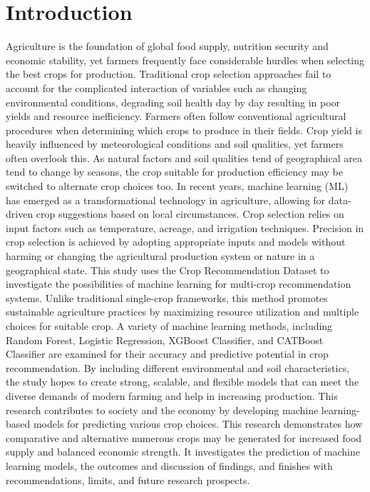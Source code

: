 \documentclass[conference]{IEEEtran}
\begin{document}
\section{Introduction}
Agriculture is the foundation of global food supply, nutrition security and economic stability, yet farmers frequently face considerable hurdles when selecting the best crops for production. Traditional crop selection approaches fail to account for the complicated interaction of variables such as changing environmental conditions, degrading soil health day by day resulting in poor yields and resource inefficiency.\cite{kumar2024enhanced} Farmers often follow conventional agricultural procedures when determining which crops to produce in their fields. Crop yield is heavily influenced by meteorological conditions and soil qualities, yet farmers often overlook this.\cite{kumar2024enhanced}  As natural factors and soil qualities tend of geographical area tend to change by seasons, the crop suitable for production efficiency may be switched to alternate crop choices too. 
In recent years, machine learning (ML) has emerged as a transformational technology in agriculture, allowing for data-driven crop suggestions based on local circumstances.\cite{9214190} Crop selection relies on input factors such as temperature, acreage, and irrigation techniques. Precision in crop selection is achieved by adopting appropriate inputs and models without harming or changing the agricultural production system or nature in a geographical state.\cite{9418375}
This study uses the Crop Recommendation Dataset to investigate the possibilities of machine learning for multi-crop recommendation systems. Unlike traditional single-crop frameworks, this method promotes sustainable agriculture practices by maximizing resource utilization and multiple choices for suitable crop. A variety of machine learning methods, including Random Forest, Logistic Regression, XGBoost Classifier, and CATBoost Classifier are examined for their accuracy and predictive potential in crop recommendation. By including different environmental and soil characteristics, the study hopes to create strong, scalable, and flexible models that can meet the diverse demands of modern farming and help in increasing production.
This research contributes to society and the economy by developing machine learning-based models for predicting various crop choices. This research demonstrates how comparative and alternative numerous crops may be generated for increased food supply and balanced economic strength. It investigates the prediction of machine learning models, the outcomes and discussion of findings, and finishes with recommendations, limits, and future research prospects.
\end{document}

